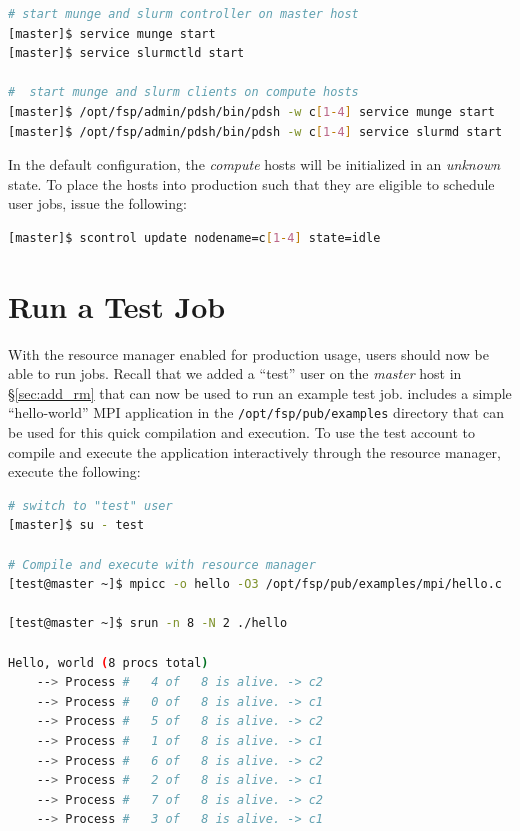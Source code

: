 \documentclass[letterpaper]{article}
\begin{document}
\begin{lstlisting}[language=bash]
# start munge and slurm controller on master host
[master]$ service munge start
[master]$ service slurmctld start

#  start munge and slurm clients on compute hosts
[master]$ /opt/fsp/admin/pdsh/bin/pdsh -w c[1-4] service munge start
[master]$ /opt/fsp/admin/pdsh/bin/pdsh -w c[1-4] service slurmd start
\end{lstlisting}

In the default configuration, the {\em compute} hosts will be initialized in an
{\em unknown} state. To place the hosts into production such that they are
eligible to schedule user jobs, issue the following:


\begin{lstlisting}[language=bash]
[master]$ scontrol update nodename=c[1-4] state=idle
\end{lstlisting}


\section{Run a Test Job}

With the resource manager enabled for production usage, users should now be
able to run jobs.  Recall that we added a ``test'' user on the {\em master}
host in \S\ref{sec:add_rm} that can now be used to run an example test job.
\FSP{} includes a simple ``hello-world'' MPI application in the
\texttt{/opt/fsp/pub/examples} directory that can be used for this quick
compilation and execution.  To use the test account to compile and execute the
application interactively through the resource manager, execute the following:

\begin{lstlisting}[language=bash,keywords={}]
# switch to "test" user
[master]$ su - test

# Compile and execute with resource manager
[test@master ~]$ mpicc -o hello -O3 /opt/fsp/pub/examples/mpi/hello.c

[test@master ~]$ srun -n 8 -N 2 ./hello

Hello, world (8 procs total)
    --> Process #   4 of   8 is alive. -> c2
    --> Process #   0 of   8 is alive. -> c1
    --> Process #   5 of   8 is alive. -> c2
    --> Process #   1 of   8 is alive. -> c1
    --> Process #   6 of   8 is alive. -> c2
    --> Process #   2 of   8 is alive. -> c1
    --> Process #   7 of   8 is alive. -> c2
    --> Process #   3 of   8 is alive. -> c1
\end{lstlisting}



\end{document}
